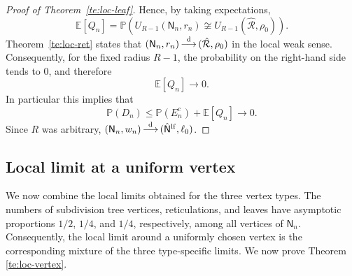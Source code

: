 \documentclass[english,11pt]{smfart}
\newcommand{\Prb}[1]{\mathbb{P}\left(#1\right)}
\newcommand{\Ex}[1]{\mathbb{E}[#1]}
\newcommand{\convdis}{\,{\buildrel \mathrm{d} \over \longrightarrow}\,}
\newcommand{\eqdist}{\,{\buildrel \mathrm{d} \over =}\,}
\newcommand{\cL}{\mathcal{L}}
\newcommand{\cR}{\mathcal{R}}
\newcommand{\mN}{\mathsf{N}}
\newtheorem{theorem}{Theorem}[section]
\numberwithin{equation}{section}
\begin{document}
\begin{proof}[Proof of Theorem~\ref{te:loc-leaf}]
Hence, by taking
expectations,
\[
\Ex{Q_n}
=
\Prb{
U_{R-1}(\mN_n,r_n)\not\cong
U_{R-1}(\hat{\cR},\rho_0)
}.
\]
Theorem~\ref{te:loc-ret} states that
\((\mN_n,r_n)\convdis(\hat{\cR},\rho_0)\) in the local weak sense.
Consequently, for the fixed radius \(R-1\), the probability on the
right-hand side tends to \(0\), and therefore
\[
\Ex{Q_n}\longrightarrow0.
\] In particular this implies that
\[
\Prb{D_n}
\le
\Prb{E_n^c}+\Ex{Q_n}
\longrightarrow0.
\] Since $R$ was arbitrary,
$(\mN_n,w_n)\convdis(\hat{\mN}^{\mathrm{lf}},\ell_0)$.
\end{proof}



\subsection{Local limit at a uniform vertex}\label{ssec:vertex}
We now combine the local limits obtained for the three vertex types.
The numbers of subdivision tree vertices, reticulations, and leaves have
asymptotic proportions \(1/2\), \(1/4\), and \(1/4\), respectively, among
all vertices of \(\mN_n\). Consequently, the local limit around a uniformly
chosen vertex is the corresponding mixture of the three type-specific
limits. We now prove Theorem \ref{te:loc-vertex}.

\end{document}
